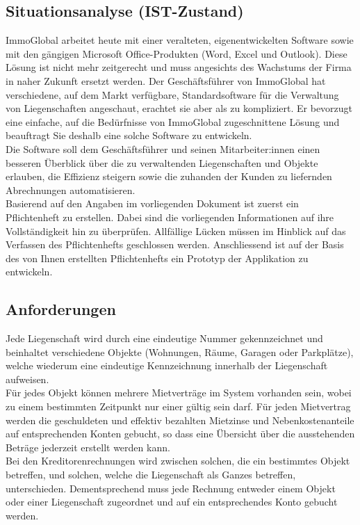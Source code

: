 \subsection{Situationsanalyse (IST-Zustand)}
ImmoGlobal arbeitet heute mit einer veralteten, eigenentwickelten Software sowie mit den gängigen Microsoft Office-Produkten (Word, Excel und Outlook). Diese Lösung ist nicht mehr zeitgerecht und muss angesichts des Wachstums der Firma in naher Zukunft ersetzt werden. Der Geschäftsführer von ImmoGlobal hat verschiedene, auf dem Markt verfügbare, Standardsoftware für die Verwaltung von Liegenschaften angeschaut, erachtet sie aber als zu kompliziert. Er bevorzugt eine einfache, auf die Bedürfnisse von ImmoGlobal zugeschnittene Lösung und beauftragt Sie deshalb eine solche Software zu entwickeln.\\
Die Software soll dem Geschäftsführer und seinen Mitarbeiter:innen einen besseren Überblick über die zu verwaltenden Liegenschaften und Objekte erlauben, die Effizienz steigern sowie die zuhanden der Kunden zu liefernden Abrechnungen automatisieren.\\
Basierend auf den Angaben im vorliegenden Dokument ist zuerst ein Pflichtenheft zu erstellen. Dabei sind die vorliegenden Informationen auf ihre Vollständigkeit hin zu überprüfen. Allfällige Lücken müssen im Hinblick auf das Verfassen des Pflichtenhefts geschlossen werden. Anschliessend ist auf der Basis des von Ihnen erstellten Pflichtenhefts ein Prototyp der Applikation zu entwickeln.

\subsection{Anforderungen}
Jede Liegenschaft wird durch eine eindeutige Nummer gekennzeichnet und beinhaltet verschiedene Objekte (Wohnungen, Räume, Garagen oder Parkplätze), welche wiederum eine eindeutige Kennzeichnung innerhalb der Liegenschaft aufweisen.\\
Für jedes Objekt können mehrere Mietverträge im System vorhanden sein, wobei zu einem bestimmten Zeitpunkt nur einer gültig sein darf. Für jeden Mietvertrag werden die geschuldeten und effektiv bezahlten Mietzinse und Nebenkostenanteile auf entsprechenden Konten gebucht, so dass eine Übersicht über die ausstehenden Beträge jederzeit erstellt werden kann.\\
Bei den Kreditorenrechnungen wird zwischen solchen, die ein bestimmtes Objekt betreffen, und solchen, welche die Liegenschaft als Ganzes betreffen, unterschieden. Dementsprechend muss jede Rechnung entweder einem Objekt oder einer Liegenschaft zugeordnet und auf ein entsprechendes Konto gebucht werden.\\

